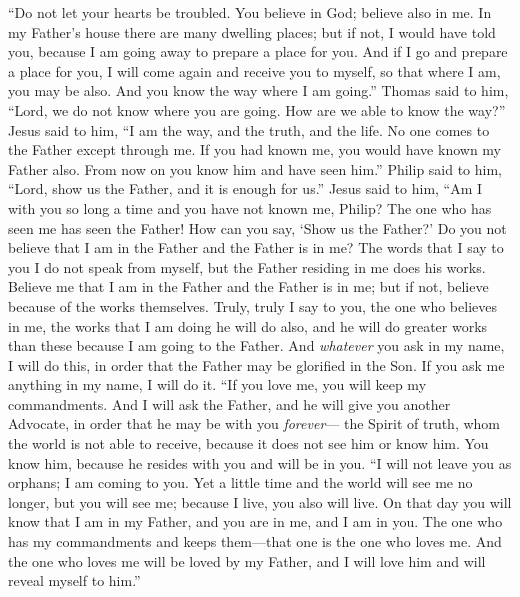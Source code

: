 \begin{biblechapter} %
 “Do not let your hearts be troubled. You believe in God; believe also in me.
\verse In my Father’s house there are many dwelling places; but if not, I would have told you, because I am going away to prepare a place for you.
\verse And if I go and prepare a place for you, I will come again and receive you to myself, so that where I am, you may be also.
\verse And you know the way where I am going.”
\verse Thomas said to him, “Lord, we do not know where you are going. How are we able to know the way?”
\verse Jesus said to him, “I am the way, and the truth, and the life. No one comes to the Father except through me.
\verse If you had known me, you would have known my Father also. From now on you know him and have seen him.”
\verse Philip said to him, “Lord, show us the Father, and it is enough for us.”
\verse Jesus said to him, “Am I with you so long a time and you have not known me, Philip? The one who has seen me has seen the Father! How can you say, ‘Show us the Father?’
\verse Do you not believe that I am in the Father and the Father is in me? The words that I say to you I do not speak from myself, but the Father residing in me does his works.
\verse Believe me that I am in the Father and the Father is in me; but if not, believe because of the works themselves.
\verse Truly, truly I say to you, the one who believes in me, the works that I am doing he will do also, and he will do greater works than these because I am going to the Father.
\verse And \textit{whatever} you ask in my name, I will do this, in order that the Father may be glorified in the Son.
\verse If you ask me anything in my name, I will do it.
 “If you love me, you will keep my commandments.
\verse And I will ask the Father, and he will give you another Advocate, in order that he may be with you \textit{forever}—
\verse the Spirit of truth, whom the world is not able to receive, because it does not see him or know him. You know him, because he resides with you and will be in you.
\verse “I will not leave you as orphans; I am coming to you.
\verse Yet a little time and the world will see me no longer, but you will see me; because I live, you also will live.
\verse On that day you will know that I am in my Father, and you are in me, and I am in you.
\verse The one who has my commandments and keeps them—that one is the one who loves me. And the one who loves me will be loved by my Father, and I will love him and will reveal myself to him.”

\end{biblechapter}

